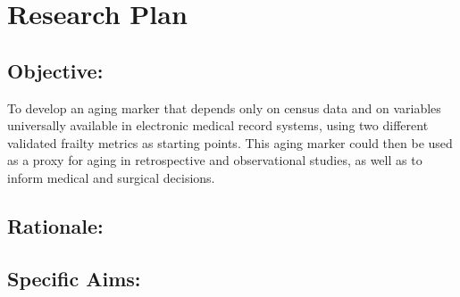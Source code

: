 \section{Research Plan }\label{research-plan}


\subsection{Objective:}\label{objective}
  

To develop an aging marker\cite{Orkaby_2017} that depends only on census data and on
variables universally available in electronic medical record systems,
using two different validated frailty metrics as starting points. This
aging marker could then be used as a proxy for aging in retrospective
and observational studies, as well as to inform medical and surgical
decisions.


\subsection{Rationale:}\label{rationale}

\subsection{Specific Aims:}\label{specific-aims}
